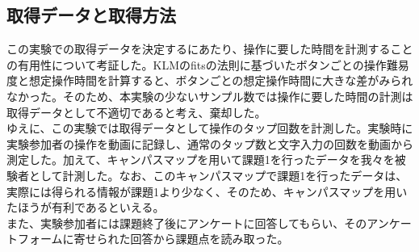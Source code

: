 \documentclass[12pt,a4paper,dvipdf]{jsarticle}
\begin{document}
\subsection{取得データと取得方法}
この実験での取得データを決定するにあたり、操作に要した時間を計測することの有用性について考証した。KLMのfitsの法則に基づいたボタンごとの操作難易度と想定操作時間を計算すると、ボタンごとの想定操作時間に大きな差がみられなかった。そのため、本実験の少ないサンプル数では操作に要した時間の計測は取得データとして不適切であると考え、棄却した。\\
ゆえに、この実験では取得データとして操作のタップ回数を計測した。実験時に実験参加者の操作を動画に記録し、通常のタップ数と文字入力の回数を動画から測定した。加えて、キャンパスマップを用いて課題1を行ったデータを我々を被験者として計測した。なお、このキャンパスマップで課題1を行ったデータは、実際には得られる情報が課題1より少なく、そのため、キャンパスマップを用いたほうが有利であるといえる。\\
また、実験参加者には課題終了後にアンケートに回答してもらい、そのアンケートフォームに寄せられた回答から課題点を読み取った。
\end{document}
